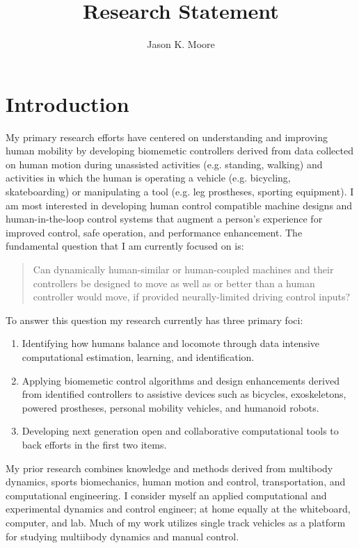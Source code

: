 \documentclass{article}
\title{Research Statement}
\author{Jason K. Moore}
\date{}
\begin{document}
\maketitle

\section*{Introduction}
%
My primary research efforts have centered on understanding and improving human
mobility by developing biomemetic controllers derived from data collected on
human motion during unassisted activities (e.g. standing, walking) and
activities in which the human is operating a vehicle (e.g. bicycling,
skateboarding) or manipulating a tool (e.g. leg prostheses, sporting
equipment). I am most interested in developing human control compatible machine
designs and human-in-the-loop control systems that augment a person's
experience for improved control, safe operation, and performance enhancement.
The fundamental question that I am currently focused on is:
%
\begin{quote}
 Can dynamically human-similar or human-coupled machines and their controllers
 be designed to move as well as or better than a human controller would move,
 if provided neurally-limited driving control inputs?
\end{quote}

To answer this question my research currently has three primary foci:
%
\begin{enumerate}
  \setlength\itemsep{0.1em}
  \item Identifying how humans balance and locomote through data intensive
    computational estimation, learning, and identification.
  \item Applying biomemetic control algorithms and design enhancements derived
    from identified controllers to assistive devices such as bicycles,
    exoskeletons, powered prostheses, personal mobility vehicles, and humanoid
    robots.
  \item Developing next generation open and collaborative computational tools
    to back efforts in the first two items.
 \end{enumerate}

My prior research combines knowledge and methods derived from multibody
dynamics, sports biomechanics, human motion and control, transportation, and
computational engineering. I consider myself an applied computational and
experimental dynamics and control engineer; at home equally at the whiteboard,
computer, and lab. Much of my work utilizes single track vehicles as a platform
for studying multiibody dynamics and manual control.
\end{document}
